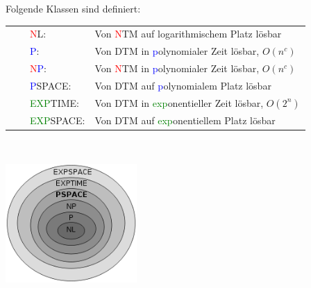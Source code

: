 \begin{minipage}{12cm}
Folgende Klassen sind definiert:\\
\newcommand{\tabitem}{~~\llap{\textbullet}~~}
\begin{tabular}{ll}
\tabitem \textcolor{red}{N}L:                       & Von \textcolor{red}{N}TM auf logarithmischem Platz lösbar \\
\tabitem \textcolor{blue}{P}:                       & Von DTM in \textcolor{blue}{p}olynomialer Zeit lösbar, $O(n^c)$\\
\tabitem \textcolor{red}{N}\textcolor{blue}{P}:     & Von \textcolor{red}{N}TM in \textcolor{blue}{p}olynomialer Zeit lösbar, $O(n^c)$\\
\tabitem \textcolor{blue}{P}SPACE:                  & Von DTM auf \textcolor{blue}{p}olynomialem Platz lösbar\\
\tabitem \textcolor{green}{EXP}TIME:                & Von DTM in \textcolor{green}{exp}onentieller Zeit lösbar, $O(2^n)$\\
\tabitem \textcolor{green}{EXP}SPACE:               & Von DTM auf \textcolor{green}{exp}onentiellem Platz lösbar
\end{tabular}
\end{minipage}~
\begin{minipage}{6cm}
\includegraphics[width=5cm]{images/Algorithmen/KomplexKlassen.png}
\end{minipage}\\

